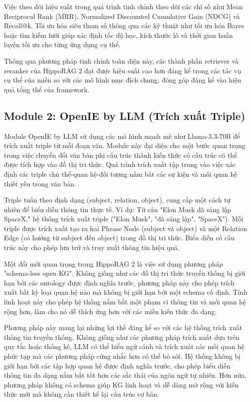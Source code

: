 \documentclass[../main.tex]{subfiles}
\begin{document}
Việc theo dõi hiệu suất trong quá trình tinh chỉnh theo dõi các chỉ số như Mean Reciprocal Rank (MRR), Normalized Discounted Cumulative Gain (NDCG) và Recall@k. Tối ưu hóa siêu tham số thông qua các kỹ thuật như tối ưu hóa Bayes hoặc tìm kiếm lưới giúp xác định tốc độ học, kích thước lô và thời gian huấn luyện tối ưu cho từng ứng dụng cụ thể.

Thông qua phương pháp tinh chỉnh toàn diện này, các thành phần retriever và reranker của HippoRAG 2 đạt được hiệu suất cao hơn đáng kể trong các tác vụ cụ thể của miền so với các mô hình mục đích chung, đóng góp đáng kể vào hiệu quả tổng thể của framework.

\subsection{Module 2: OpenIE by LLM (Trích xuất Triple)}
Module OpenIE by LLM sử dụng các mô hình mạnh mẽ như Llama-3.3-70B để trích xuất triple từ mỗi đoạn văn. Module này đại diện cho một bước quan trọng trong việc chuyển đổi văn bản phi cấu trúc thành kiến thức có cấu trúc có thể được tích hợp vào đồ thị tri thức. Quá trình trích xuất tập trung vào việc xác định các triple chủ thể-quan hệ-đối tượng nắm bắt các sự kiện và mối quan hệ thiết yếu trong văn bản.

Triple tuân theo định dạng (subject, relation, object), cung cấp một cách tự nhiên để biểu diễn thông tin thực tế. Ví dụ: Từ câu "Elon Musk đã sáng lập SpaceX," hệ thống trích xuất triple ("Elon Musk", "đã sáng lập", "SpaceX"). Mỗi triple được trích xuất tạo ra hai Phrase Node (subject và object) và một Relation Edge (có hướng từ subject đến object) trong đồ thị tri thức. Biểu diễn có cấu trúc này cho phép lưu trữ và truy xuất thông tin hiệu quả.

Một đổi mới quan trọng trong HippoRAG 2 là việc sử dụng phương pháp "schema-less open KG". Không giống như các đồ thị tri thức truyền thống bị giới hạn bởi các ontology được định nghĩa trước, phương pháp này cho phép trích xuất bất kỳ loại quan hệ nào mà không bị giới hạn bởi một schema cố định. Tính linh hoạt này cho phép hệ thống nắm bắt một phạm vi thông tin và mối quan hệ rộng hơn, làm cho nó dễ thích ứng hơn với các miền kiến thức đa dạng.

Phương pháp này mang lại những lợi thế đáng kể so với các hệ thống trích xuất thông tin truyền thống. Không giống như các phương pháp trích xuất dựa trên quy tắc hoặc thống kê, LLM có thể hiểu ngữ cảnh và trích xuất các mối quan hệ phức tạp mà các phương pháp cứng nhắc hơn có thể bỏ sót. Hệ thống không bị giới hạn bởi các tập hợp quan hệ được định nghĩa trước, cho phép biểu diễn thông tin đa dạng nắm bắt tốt hơn các sắc thái của ngôn ngữ tự nhiên. Hơn nữa, phương pháp không có schema giúp KG linh hoạt và dễ dàng mở rộng với kiến thức mới mà không cần thiết kế lại cấu trúc cơ bản.
\end{document}
